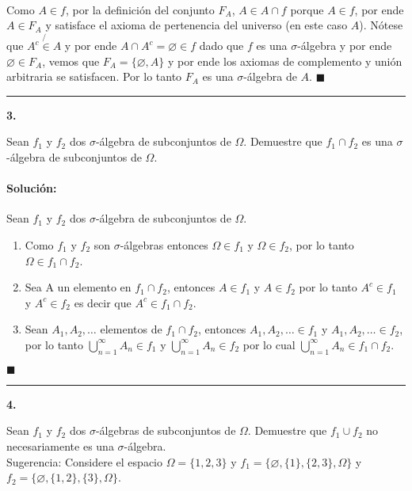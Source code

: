 \documentclass[11pt]{article}
\begin{document}
\paragraph{}Como $A \in f$, por la definición del conjunto $F_A$, $A \in A \cap f$ porque $A \in f$, por ende $A \in F_A$ y satisface el axioma de pertenencia del universo (en este caso $A$). Nótese que $A^c \not{\in} A$ y por ende $A \cap A^c = \varnothing \in f$ dado que $f$ es una $\sigma$-álgebra y por ende $\varnothing \in F_A$, vemos que $F_A = \{\varnothing, A\}$ y por ende los axiomas de complemento y unión arbitraria se satisfacen. Por lo tanto $F_A$ es una $\sigma$-álgebra de $A$. $\blacksquare$
\begin{center}\rule{1\textwidth}{0.1mm} \end{center}
\textbf{3.} \par
Sean $f_{1}$ y $f_{2}$ dos $\sigma$-álgebra de subconjuntos de $\Omega$. Demuestre que $f_{1} \cap f_{2}$ es una $\sigma$-álgebra de subconjuntos de $\Omega$.\\
\par
\paragraph{Solución:}
Sean $f_{1}$ y $f_{2}$ dos $\sigma$-álgebra de subconjuntos de $\Omega$. 
\begin{enumerate}[$i)$]
    \item Como $f_{1}$ y $f_{2}$ son $\sigma$-álgebras entonces $\Omega \in f_{1}$ y $\Omega \in f_{2}$, por lo tanto $\Omega \in f_{1} \cap f_{2}$.
    \item Sea A un elemento en $f_{1} \cap f_{2}$, entonces $A \in f_{1}$ y $A \in f_{2}$ por lo tanto $A^{c} \in f_{1}$ y $A^{c} \in f_{2}$ es decir que $A^{c} \in f_{1} \cap f_{2}$.
    \item Sean $A_{1}, A_{2}, \dots $ elementos de $f_{1} \cap f_{2}$, entonces $A_{1}, A_{2}, \dots \in f_{1}$ y $A_{1},A_{2}, \dots \in f_{2}$, por lo tanto $\displaystyle\bigcup_{n=1}^{\infty} A_{n} \in f_{1}$ y $ \displaystyle\bigcup_{n=1}^{\infty} A_{n} \in f_{2}$ por lo cual $\displaystyle\bigcup_{n=1}^{\infty} A_{n} \in f_{1} \cap f_{2}$. 
\end{enumerate}
$\blacksquare$
\begin{center}\rule{1\textwidth}{0.1mm} \end{center}
\textbf{4.} \par 
Sean $f_{1}$ y $f_{2}$ dos $\sigma$-álgebras de subconjuntos de $\Omega$. Demuestre que $f_{1} \cup f_{2}$ no necesariamente es una $\sigma$-álgebra. 
\\Sugerencia: Considere el espacio $\Omega = \{1, 2, 3\}$ y $f_{1} = \{\varnothing, \{1\}, \{2, 3\}, \Omega \}$ y $f_{2} = \{\varnothing, \{1, 2\}, \{3\}, \Omega \}$.\\
\par
\end{document}
